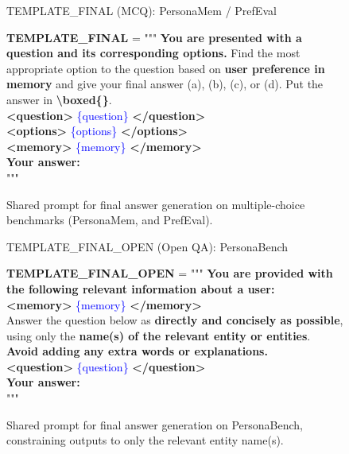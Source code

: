 \begin{figure}[!ht]
\begin{AIboxPurpleFrame}{TEMPLATE\_FINAL (MCQ): PersonaMem  / PrefEval}
\vspace{1mm}
{\footnotesize
\setlength{\parindent}{0pt}
\setlength{\parskip}{2pt}

\textbf{TEMPLATE\_FINAL} = """ \textbf{You are presented with a question and its corresponding options.} Find the most appropriate option to the question based on \textbf{user preference in memory} and give your final answer (a), (b), (c), or (d). Put the answer in \textbf{\textbackslash boxed\{\}}. \\

\textbf{<question>} \textcolor{blue}{\{question\}} \textbf{</question>} \\

\textbf{<options>} \textcolor{blue}{\{options\}} \textbf{</options>} \\

\textbf{<memory>} \textcolor{blue}{\{memory\}} \textbf{</memory>} \\

\textbf{Your answer:} \\
"""
}
\end{AIboxPurpleFrame}
\vspace{-1em}
\caption{Shared prompt for final answer generation on multiple-choice benchmarks (PersonaMem, and PrefEval).}
\label{prompt:final_mcq}
\end{figure}

\begin{figure}[!ht]
\begin{AIboxPurpleFrame}{TEMPLATE\_FINAL\_OPEN (Open QA): PersonaBench}
\vspace{1mm}
{\footnotesize
\setlength{\parindent}{0pt}
\setlength{\parskip}{2pt}

\textbf{TEMPLATE\_FINAL\_OPEN} = """ \textbf{You are provided with the following relevant information about a user:} \\

\textbf{<memory>} \textcolor{blue}{\{memory\}} \textbf{</memory>} \\

Answer the question below as \textbf{directly and concisely as possible}, using only the \textbf{name(s) of the relevant entity or entities}. \textbf{Avoid adding any extra words or explanations.} \\

\textbf{<question>} \textcolor{blue}{\{question\}} \textbf{</question>} \\

\textbf{Your answer:} \\
"""
}
\end{AIboxPurpleFrame}
\vspace{-1em}
\caption{Shared prompt for final answer generation on PersonaBench, constraining outputs to only the relevant entity name(s).}
\label{prompt:final_open}
\end{figure}

